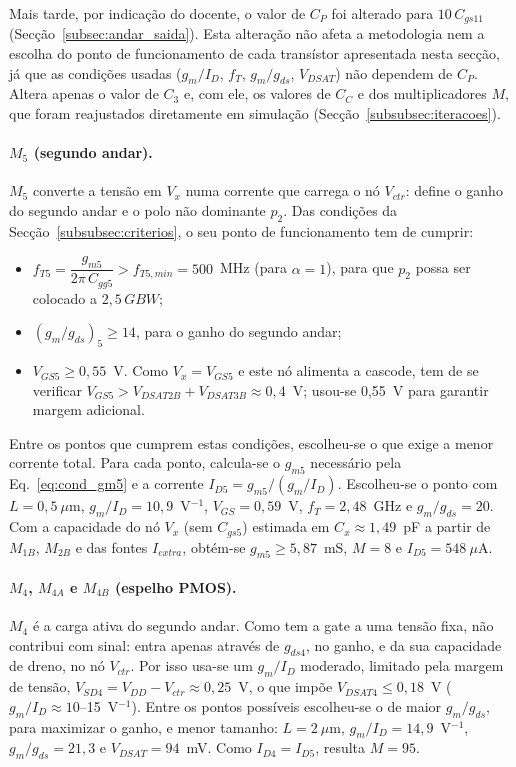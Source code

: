 Mais tarde, por indicação do docente, o valor de $C_P$ foi alterado para $10\,C_{gs11}$ (Secção~\ref{subsec:andar_saida}). Esta alteração não
afeta a metodologia nem a escolha do ponto de funcionamento de cada transístor apresentada nesta secção, já que as
condições usadas ($g_m/I_D$, $f_T$, $g_m/g_{ds}$, $V_{DSAT}$) não dependem de $C_P$. Altera apenas o valor de $C_3$ e,
com ele, os valores de $C_C$ e dos multiplicadores $M$, que foram reajustados diretamente em simulação
(Secção~\ref{subsubsec:iteracoes}).

\paragraph{$M_5$ (segundo andar).}
$M_5$ converte a tensão em $V_x$ numa corrente que carrega o nó $V_{ctr}$: define o ganho do
segundo andar e o polo não dominante $p_2$. Das condições da Secção~\ref{subsubsec:criterios},
o seu ponto de funcionamento tem de cumprir:
\begin{itemize}
    \item $f_{T5} = \dfrac{g_{m5}}{2\pi\,C_{gg5}} > f_{T5,min} = 500$~MHz (para $\alpha = 1$),
    para que $p_2$ possa ser colocado a $2{,}5\,GBW$;
    \item $(g_m/g_{ds})_5 \ge 14$, para o ganho do segundo andar;
    \item $V_{GS5} \ge 0{,}55$~V. Como $V_x = V_{GS5}$ e este nó alimenta a cascode, tem de se verificar $V_{GS5} > V_{DSAT2B} + V_{DSAT3B} \approx 0{,}4$~V; usou-se 0,55~V para garantir margem adicional.
\end{itemize}

Entre os pontos que cumprem estas condições, escolheu-se o que exige a menor corrente total.
Para cada ponto, calcula-se o $g_{m5}$ necessário pela Eq.~\eqref{eq:cond_gm5} e a corrente
$I_{D5} = g_{m5}/(g_m/I_D)$. Escolheu-se o ponto com $L = 0{,}5~\mu$m, $g_m/I_D = 10{,}9$~V$^{-1}$, $V_{GS}
= 0{,}59$~V, $f_T = 2{,}48$~GHz e $g_m/g_{ds} = 20$. Com a capacidade do nó $V_x$ (sem $C_{gs5}$)
estimada em $C_x \approx 1{,}49$~pF a partir de $M_{1B}$, $M_{2B}$ e das fontes $I_{extra}$,
obtém-se $g_{m5} \ge 5{,}87$~mS, $M = 8$ e $I_{D5} = 548~\mu$A.

\paragraph{$M_4$, $M_{4A}$ e $M_{4B}$ (espelho PMOS).}
$M_4$ é a carga ativa do segundo andar. Como tem a gate a uma tensão fixa, não contribui com sinal:
entra apenas através de $g_{ds4}$, no ganho, e da sua capacidade de dreno, no nó $V_{ctr}$. Por isso
usa-se um $g_m/I_D$ moderado, limitado pela margem de tensão, $V_{SD4} = V_{DD} - V_{ctr} \approx
0{,}25$~V, o que impõe $V_{DSAT4} \le 0{,}18$~V ($g_m/I_D \approx 10$--15~V$^{-1}$). Entre os pontos
possíveis escolheu-se o de maior $g_m/g_{ds}$, para maximizar o ganho, e menor tamanho: $L = 2~\mu$m,
$g_m/I_D = 14{,}9$~V$^{-1}$, $g_m/g_{ds} = 21{,}3$ e $V_{DSAT} = 94$~mV. Como $I_{D4} = I_{D5}$,
resulta $M = 95$.

